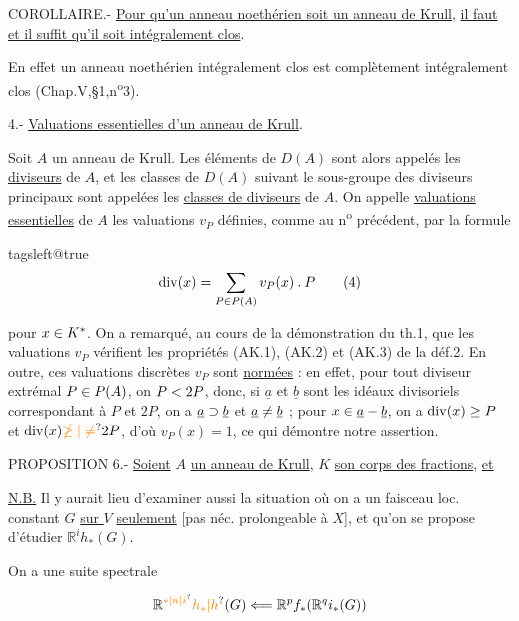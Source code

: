 COROLLAIRE.- \uline{Pour qu'un anneau noethérien soit un anneau de Krull}, \uline{il faut et il suffit qu'il soit intégralement clos}.

En effet un anneau noethérien intégralement clos est complètement intégralement clos (Chap.V,\S1,n\textsuperscript{o}3).

4.- \uline{Valuations essentielles d'un anneau de Krull}.

Soit $A$ un anneau de Krull. Les éléments de $D(A)$ sont alors appelés les \uline{diviseurs} de $A$, et les classes de $D(A)$ suivant le sous-groupe des diviseurs principaux sont appelées les \uline{classes de diviseurs} de $A$. On appelle \uline{valuations essentielles} de $A$ les valuations $v_P$ définies, comme au n\textsuperscript{o} précédent, par la formule

\begingroup\csname tagsleft@true\endcsname
\[ \operatorname{div}(x)=\sum_{P\in P(A)}v_P(x)\mathbin{.}P\tag*{(4)} \]
\endgroup

pour $x\in K^{*}$. On a remarqué, au cours de la démonstration du th.1, que les valuations $v_P$ vérifient les propriétés (AK.1), (AK.2) et (AK.3) de la déf.2.
En outre, ces valuations discrètes $v_P$ sont \uline{normées} : en effet, pour tout diviseur extrémal $P\in P(A)$, on  $P<2P$, donc, si $\underline a$ et $\underline b$ sont les idéaux divisoriels correspondant à $P$ et $2P$, on a $\underline a\supset\underline b$ et $\underline a\ne\underline b$ ; pour $x\in\underline a-\underline b$, on a $\operatorname{div}(x)\geq P$ et $\operatorname{div}(x)\handwritten{\unsure{\ngeq|\ne}}2P$, d'où $v_P(x)=1$, ce qui démontre notre assertion.

PROPOSITION 6.- \uline{Soient} $A$ \uline{un anneau de Krull}, $K$ \uline{son corps des fractions}, \uline{et}


\uline{N.B.} Il y aurait lieu d'examiner aussi la situation où
on a un faisceau loc. constant
$G$ \uline{sur $V$} \uline{seulement} [pas néc.
prolongeable à $X$],  et qu'on
se propose d'étudier  $\mathbb R^i h_*(G)$.

On a une suite  spectrale

\[ \mathbb R^{\unsure{*|n|i}}\unsure{h_*|h}(G)\Longleftarrow \mathbb R^p f_*(\mathbb R^q i_*(G)) \]

